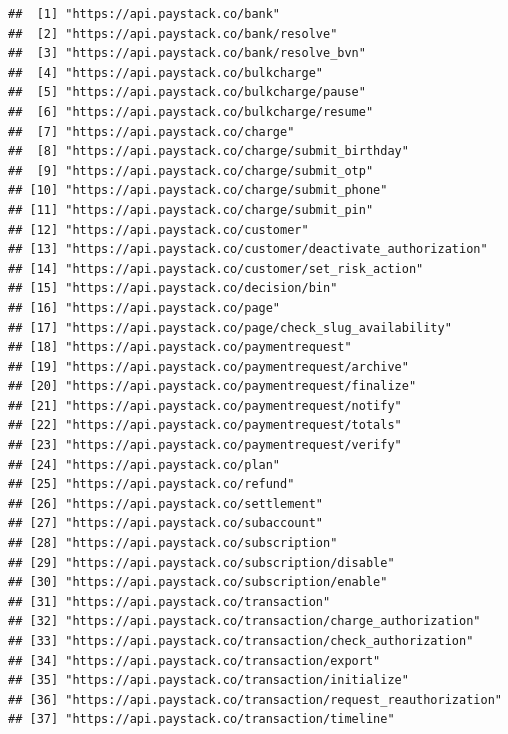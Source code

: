 \documentclass[]{book}
\begin{document}
\begin{verbatim}
##  [1] "https://api.paystack.co/bank"                               
##  [2] "https://api.paystack.co/bank/resolve"                       
##  [3] "https://api.paystack.co/bank/resolve_bvn"                   
##  [4] "https://api.paystack.co/bulkcharge"                         
##  [5] "https://api.paystack.co/bulkcharge/pause"                   
##  [6] "https://api.paystack.co/bulkcharge/resume"                  
##  [7] "https://api.paystack.co/charge"                             
##  [8] "https://api.paystack.co/charge/submit_birthday"             
##  [9] "https://api.paystack.co/charge/submit_otp"                  
## [10] "https://api.paystack.co/charge/submit_phone"                
## [11] "https://api.paystack.co/charge/submit_pin"                  
## [12] "https://api.paystack.co/customer"                           
## [13] "https://api.paystack.co/customer/deactivate_authorization"  
## [14] "https://api.paystack.co/customer/set_risk_action"           
## [15] "https://api.paystack.co/decision/bin"                       
## [16] "https://api.paystack.co/page"                               
## [17] "https://api.paystack.co/page/check_slug_availability"       
## [18] "https://api.paystack.co/paymentrequest"                     
## [19] "https://api.paystack.co/paymentrequest/archive"             
## [20] "https://api.paystack.co/paymentrequest/finalize"            
## [21] "https://api.paystack.co/paymentrequest/notify"              
## [22] "https://api.paystack.co/paymentrequest/totals"              
## [23] "https://api.paystack.co/paymentrequest/verify"              
## [24] "https://api.paystack.co/plan"                               
## [25] "https://api.paystack.co/refund"                             
## [26] "https://api.paystack.co/settlement"                         
## [27] "https://api.paystack.co/subaccount"                         
## [28] "https://api.paystack.co/subscription"                       
## [29] "https://api.paystack.co/subscription/disable"               
## [30] "https://api.paystack.co/subscription/enable"                
## [31] "https://api.paystack.co/transaction"                        
## [32] "https://api.paystack.co/transaction/charge_authorization"   
## [33] "https://api.paystack.co/transaction/check_authorization"    
## [34] "https://api.paystack.co/transaction/export"                 
## [35] "https://api.paystack.co/transaction/initialize"             
## [36] "https://api.paystack.co/transaction/request_reauthorization"
## [37] "https://api.paystack.co/transaction/timeline"               

\end{verbatim}
\end{document}
